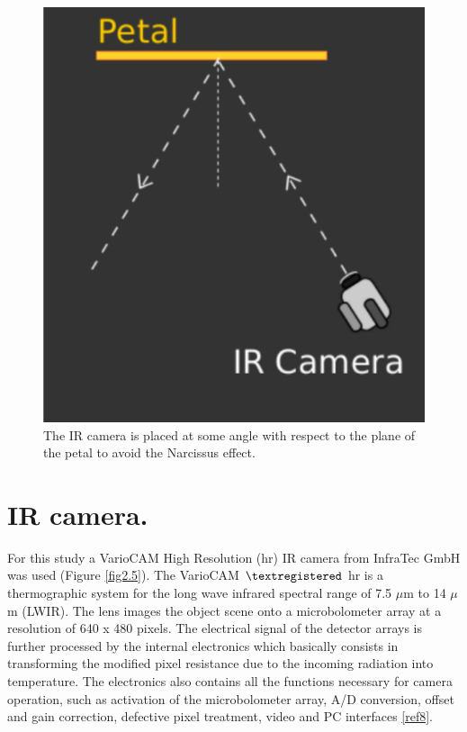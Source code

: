 		\begin{figure}[ht!]
			\centering
			\captionsetup{justification=centering,margin=2cm}
			\includegraphics[scale=0.25]{Figures/Chapter02/NarcissusEffect.pdf}
			\caption{The IR camera is placed at some angle with respect to the plane of the petal to avoid the Narcissus effect.}\label{fig2.4}
		\end{figure}\bigskip
		
	\section{IR camera.}\label{section2.3}
	
		For this study a VarioCAM High Resolution (hr) IR camera from InfraTec GmbH was used (Figure \ref{fig2.5}). The VarioCAM $\textregistered$ hr is a thermographic system for the long wave infrared spectral range of 7.5 $\mu$m to 14 $\mu$m (LWIR). The lens images the object scene onto a microbolometer array at a resolution of 640 x 480 pixels. The electrical signal of the detector arrays is further processed by the internal electronics which basically consists in transforming the modified pixel resistance due to the incoming radiation into temperature. The electronics also contains all the functions necessary for camera operation, such as activation of the microbolometer array, A/D conversion, offset and gain correction, defective pixel treatment, video and PC interfaces \ref{ref8}.
		
